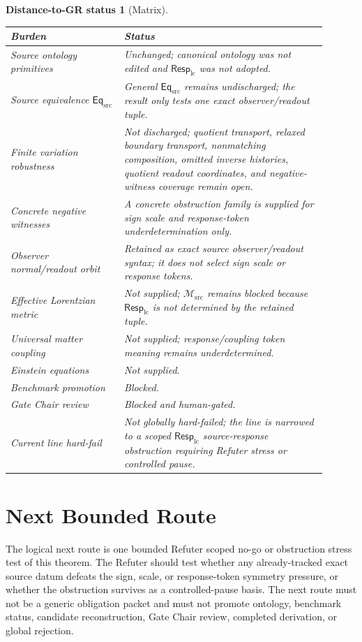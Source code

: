 \documentclass[11pt]{article}
\newcommand{\EqSrc}{\mathsf{Eq}_{\mathrm{src}}}
\newcommand{\Msrc}{\mathcal{M}_{\mathrm{src}}}
\newcommand{\RespLC}{\mathsf{Resp}_{\mathrm{lc}}}
\newtheorem{distancestatus}{Distance-to-GR status}
\begin{document}
\begin{distancestatus}[Matrix]
\begin{center}
\small
\begin{tabular}{p{0.32\linewidth}p{0.58\linewidth}}
\hline
\textbf{Burden} & \textbf{Status} \\
\hline
Source ontology primitives & Unchanged; canonical ontology was not edited and \(\RespLC\) was not adopted. \\
Source equivalence \(\EqSrc\) & General \(\EqSrc\) remains undischarged; the result only tests one exact observer/readout tuple. \\
Finite variation robustness & Not discharged; quotient transport, relaxed boundary transport, nonmatching composition, omitted inverse histories, quotient readout coordinates, and negative-witness coverage remain open. \\
Concrete negative witnesses & A concrete obstruction family is supplied for sign scale and response-token underdetermination only. \\
Observer normal/readout orbit & Retained as exact source observer/readout syntax; it does not select sign scale or response tokens. \\
Effective Lorentzian metric & Not supplied; \(\Msrc\) remains blocked because \(\RespLC\) is not determined by the retained tuple. \\
Universal matter coupling & Not supplied; response/coupling token meaning remains underdetermined. \\
Einstein equations & Not supplied. \\
Benchmark promotion & Blocked. \\
Gate Chair review & Blocked and human-gated. \\
Current line hard-fail & Not globally hard-failed; the line is narrowed to a scoped \(\RespLC\) source-response obstruction requiring Refuter stress or controlled pause. \\
\hline
\end{tabular}
\end{center}
\end{distancestatus}

\section{Next Bounded Route}

The logical next route is one bounded Refuter scoped no-go or
obstruction stress test of this theorem. The Refuter should test
whether any already-tracked exact source datum defeats the sign,
scale, or response-token symmetry pressure, or whether the obstruction
survives as a controlled-pause basis. The next route must not be a
generic obligation packet and must not promote ontology, benchmark
status, candidate reconstruction, Gate Chair review, completed
derivation, or global rejection.
\end{document}
